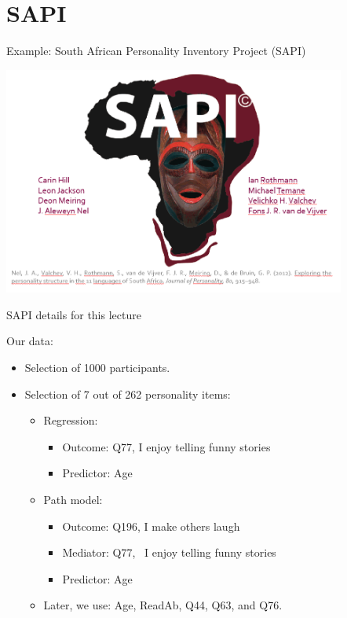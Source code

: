 \documentclass[10pt]{beamer}\usepackage[]{graphicx}\usepackage[]{xcolor}
\begin{document}
\section{SAPI}
%
%
\begin{frame}{Example: South African Personality Inventory Project (SAPI)}

\includegraphics[height=7.5cm,keepaspectratio=T] {SAPI.png}

\end{frame}
%
\begin{frame}{SAPI details for this lecture}

Our data: 
\begin{itemize}
    \item Selection of 1000 participants.
    \item Selection of 7 out of 262 personality items:
        \begin{itemize}
        \item Regression:
          \begin{itemize}
          \item{Outcome: Q77, I enjoy telling funny stories}
          \item{Predictor: Age}
          \end{itemize}
        \item Path model:
          \begin{itemize}
          \item{Outcome: Q196, I make others laugh}
          \item{Mediator: Q77, \ I enjoy telling funny stories}
          \item{Predictor: Age}
          \end{itemize}
        \item Later, we use: Age, ReadAb, Q44, Q63, and Q76.
        \end{itemize}
\end{itemize}
\end{frame}
%
\end{document}

